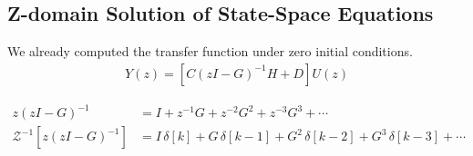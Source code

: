 \documentclass[twoside]{article}
\begin{document}
\subsection*{Z-domain Solution of State-Space Equations}

We already computed the transfer function under zero initial
conditions.
%
\begin{align*}
  Y(z) =  \left[ C \left(z I - G \right)^{-1} H + D \right] U(z)
\end{align*}
%

%
\begin{align*}
z \left( z I - G \right)^{-1} &= I + z^{-1} G + z^{-2} G^2 + z^{-3} G^3
  + \cdots
\\
\mathcal{Z}^{-1} \left[ z \left( z I - G \right)^{-1} \right] &=
I \, \delta[k] + G \, \delta[k-1] + G^2 \, \delta[k-2] + G^3 \,
  \delta[k-3] + \cdots 
\end{align*}
%

\newpage
\end{document}

